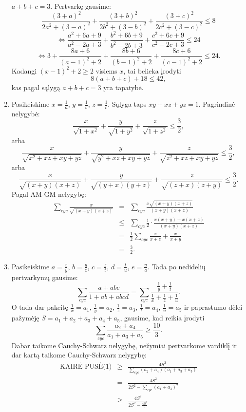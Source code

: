 \begin{enumerate}
    $a+b+c=3$. Pertvarkę gausime:
    $$\frac{(3+a)^2}{2a^2+(3-a)^2}+\frac{(3+b)^2}{2b^2+(3-b)^2}+\frac{(3+c)^2}{2c^2+(3-c)^2}\leq8$$
    $$\Leftrightarrow\frac{a^2+6a+9}{a^2-2a+3}+\frac{b^2+6b+9}{b^2-2b+3}+\frac{c^2+6c+9}{c^2-2c+3}\leq24$$
    $$\Leftrightarrow3+\frac{8a+6}{(a-1)^2+2}+\frac{8b+6}{(b-1)^2+2}+\frac{8c+6}{(c-1)^2+2}\leq24.
    $$ Kadangi $(x-1)^2+2\geq2$ visiems $x$, tai belieka įrodyti
    $$8(a+b+c)+18\leq42,$$ kas pagal sąlygą $a+b+c=3$ yra tapatybė.
\item
    Pasikeiskime $x=\frac{1}{a}$, $y=\frac{1}{b}$, $z=\frac{1}{c}$. Sąlyga
    taps $xy+xz+yz=1$. Pagrindinė nelygybė:
    $$\frac{x}{\sqrt{1+x^2}}+\frac{y}{\sqrt{1+y^2}}+\frac{z}{\sqrt{1+z^2}}\leq\frac{3}{2},$$
    arba
    $$\frac{x}{\sqrt{x^2+xz+xy+yz}}+\frac{y}{\sqrt{y^2+xz+xy+yz}}+\frac{z}{\sqrt{z^2+xz+xy+yz}}\leq\frac{3}{2},$$
    arba
    $$\frac{x}{\sqrt{(x+y)(x+z)}}+\frac{y}{\sqrt{(y+x)(y+z)}}+\frac{z}{\sqrt{(z+x)(z+y)}}\leq\frac{3}{2}.$$
    Pagal AM-GM nelygybę:
    \begin{eqnarray*}\sum_{cyc}{\frac{x}{\sqrt{(x+y)(x+z)}}}
    &=&\sum_{cyc}{\frac{x\sqrt{(x+y)(x+z)}}{(x+y)(x+z)}} \\
    &\leq&\sum_{cyc}{\frac{1}{2}\cdot\frac{x(x+y)+x(x+z)}{(x+y)(x+z)}}\\
    &=&\frac{1}{2}\sum_{cyc}{\frac{x}{x+z}+\frac{x}{x+y}}\\&=&\frac{3}{2}.\end{eqnarray*}
\item
    Pasikeiskime $a=\frac{x}{y}$, $b=\frac{y}{z}$, $c=\frac{z}{t}$,
    $d=\frac{t}{u}$, $e=\frac{u}{a}$. Tada po nedidelių pertvarkymų
    gausime:
    $$\sum_{cyc}{\frac{a+abc}{1+ab+abcd}}=\sum_{cyc}{\frac{\frac{1}{y}+\frac{1}{t}}{\frac{1}{x}+\frac{1}{z}+\frac{1}{u}}}.$$
    O tada dar pakeitę $\frac{1}{x}=a_1$, $\frac{1}{y}=a_2$,
    $\frac{1}{z}=a_3$, $\frac{1}{t}=a_4$, $\frac{1}{u}=a_5$ ir paprastumo
    dėlei pažymėję $S=a_1+a_2+a_3+a_4+a_5$, gausime, kad reikia įrodyti
    \begin{equation*}\sum_{cyc}{\frac{a_2+a_4}{a_1+a_3+a_5}}\geq\frac{10}{3}.\tag{1}\end{equation*}
    Dabar taikome Cauchy-Schwarz nelygybę, nežymiai pertvarkome vardiklį
    ir dar kartą taikome Cauchy-Schwarz nelygybę:
    \begin{eqnarray*}\text{KAIRĖ
    PUSĖ(1)}&\geq&\frac{4S^2}{\sum\limits_{cyc}{(a_2+a_4)(a_1+a_3+a_5)}}\\
    &=&\frac{4S^2}{2S^2-\sum\limits_{cyc}{(a_1+a_3)^2}}\\
    &\geq&\frac{4S^2}{2S^2-\frac{4S^2}{5}}\\

\end{eqnarray*}
\end{enumerate}
